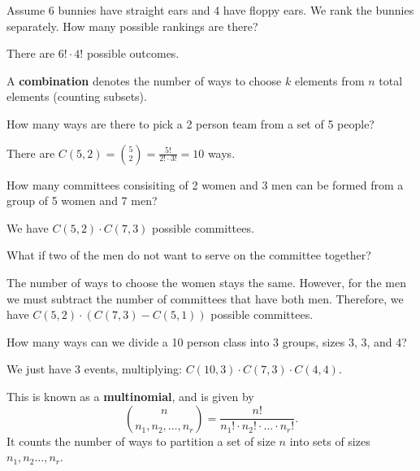 \begin{eg}
	Assume 6 bunnies have straight ears and 4 have floppy ears. We rank the bunnies separately. How many possible rankings are there?
\end{eg}
\begin{explanation}
	There are \( 6! \cdot 4! \) possible outcomes.
\end{explanation}

\begin{definition}
	A \textbf{combination} denotes the number of ways to choose \( k \) elements from \( n \) total elements (counting subsets).
\end{definition}

\begin{eg}
	How many ways are there to pick a 2 person team from a set of 5 people?
\end{eg}
\begin{explanation}
	There are \( C(5,2) = \binom{5}{2} = \frac{5!}{2!\cdot 3!} = 10 \) ways.
\end{explanation}

\begin{eg}
	How many committees consisiting of 2 women and 3 men can be formed from a group of 5 women and 7 men?
\end{eg}
\begin{explanation}
	We have \( C(5,2) \cdot C(7,3) \) possible committees.
\end{explanation}

\begin{eg}
	What if two of the men do not want to serve on the committee together?
\end{eg}
\begin{explanation}
	The number of ways to choose the women stays the same. However, for the men we must subtract the number of committees that have both men. Therefore, we have \( C(5,2) \cdot (C(7,3) - C(5,1)) \) possible committees.
\end{explanation}

\begin{eg}
	How many ways can we divide a 10 person class into 3 groups, sizes 3, 3, and 4?
\end{eg}
\begin{explanation}
	We just have 3 events, multiplying: \( C(10,3)\cdot C(7,3)\cdot C(4,4) \).
\end{explanation}

\begin{definition}
	This is known as a \textbf{multinomial}, and is given by \[
		\binom{n}{n_{1}, n_{2}, \ldots , n_r} = \frac{n!}{n_{1}! \cdot n_{2}! \cdot \ldots \cdot n_r!}
	.\] It counts the number of ways to partition a set of size \( n \) into sets of sizes \( n_{1},n_{2}\ldots ,n_r \).
\end{definition}

